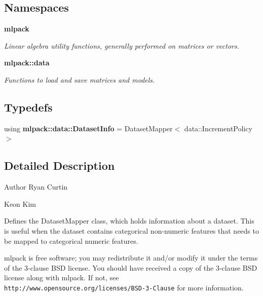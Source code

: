 \subsection*{Namespaces}
\begin{DoxyCompactItemize}
\item 
 {\bf mlpack}
\begin{DoxyCompactList}\small\item\em Linear algebra utility functions, generally performed on matrices or vectors. \end{DoxyCompactList}\item 
 {\bf mlpack\+::data}
\begin{DoxyCompactList}\small\item\em Functions to load and save matrices and models. \end{DoxyCompactList}\end{DoxyCompactItemize}
\subsection*{Typedefs}
\begin{DoxyCompactItemize}
\item 
using {\bf mlpack\+::data\+::\+Dataset\+Info} = Dataset\+Mapper$<$ data\+::\+Increment\+Policy $>$
\end{DoxyCompactItemize}


\subsection{Detailed Description}
\begin{DoxyAuthor}{Author}
Ryan Curtin 

Keon Kim
\end{DoxyAuthor}
Defines the Dataset\+Mapper class, which holds information about a dataset. This is useful when the dataset contains categorical non-\/numeric features that needs to be mapped to categorical numeric features.

mlpack is free software; you may redistribute it and/or modify it under the terms of the 3-\/clause B\+SD license. You should have received a copy of the 3-\/clause B\+SD license along with mlpack. If not, see {\tt http\+://www.\+opensource.\+org/licenses/\+B\+S\+D-\/3-\/\+Clause} for more information. 